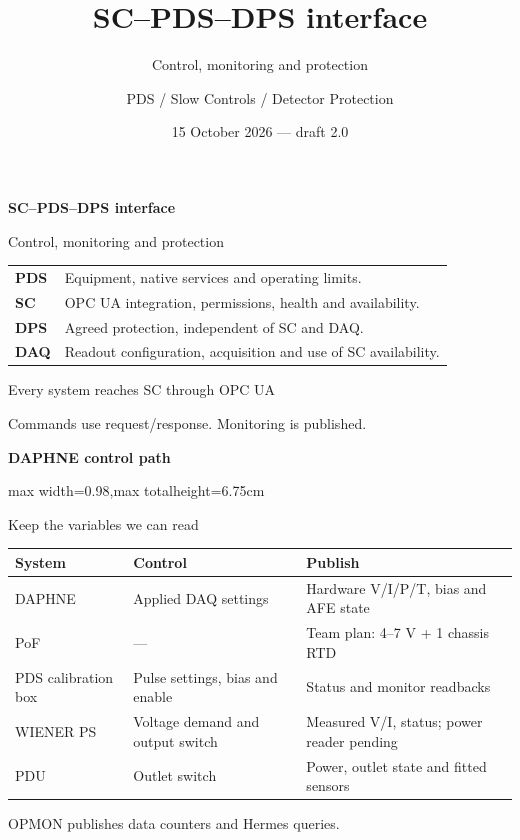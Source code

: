 \documentclass[aspectratio=169,11pt]{beamer}
\title[SC--PDS--DPS interface]{SC--PDS--DPS interface}
\subtitle{Control, monitoring and protection}
\author{PDS / Slow Controls / Detector Protection}
\date{15 October 2026 --- draft 2.0}
\begin{document}
\begin{frame}[plain]
  \bigskip
  {\bfseries\fontsize{28}{32}\selectfont SC--PDS--DPS interface\par}
  \medskip
  {\large Control, monitoring and protection\par}
  \bigskip
  \renewcommand{\arraystretch}{1.45}
  \begin{tabularx}{\textwidth}{@{}p{1.2cm}X@{}}
    \textbf{PDS} & Equipment, native services and operating limits.\\
    \textbf{SC} & OPC UA integration, permissions, health and availability.\\
    \textbf{DPS} & Agreed protection, independent of SC and DAQ.\\
    \textbf{DAQ} & Readout configuration, acquisition and use of SC availability.\\
  \end{tabularx}\par
\end{frame}

\begin{frame}{Every system reaches SC through OPC UA}
  \centering
  \par
  \raggedright
  Commands use request/response. Monitoring is published.
\end{frame}

\begin{frame}[plain]
  \relax
  {\large\bfseries DAPHNE control path\par}
  \smallskip
  \centering
  \begingroup
    \ICDLabelBackground
    \begin{adjustbox}{max width=0.98\textwidth,max totalheight=6.75cm}
      
    \end{adjustbox}
  \endgroup\par
\end{frame}

\begin{frame}{Keep the variables we can read}
  \relax
  \small
  \renewcommand{\arraystretch}{1.40}
  \begin{tabularx}{\textwidth}{@{}p{3.0cm}X X@{}}
    \toprule
    System & Control & Publish\\
    \midrule
    DAPHNE & Applied DAQ settings & Hardware V/I/P/T, bias and AFE state\\
    PoF & --- & Team plan: 4--7 V + 1 chassis RTD\\
    PDS calibration box & Pulse settings, bias and enable & Status and monitor readbacks\\
    WIENER PS & Voltage demand and output switch & Measured V/I, status; power reader pending\\
    PDU & Outlet switch & Power, outlet state and fitted sensors\\
    \bottomrule
  \end{tabularx}\par
  \medskip
  \normalsize
  OPMON publishes data counters and Hermes queries.
\end{frame}
\end{document}
